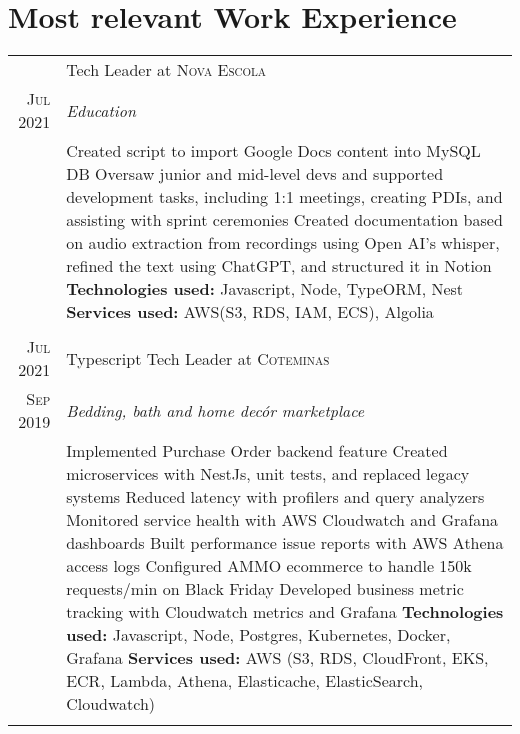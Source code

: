 \documentclass[a4paper,10pt]{article}
\begin{document}
\section{Most relevant Work Experience}
\begin{tabular}{r|p{11cm}}

\textsc & Tech Leader at \textsc{Nova Escola} \\\textsc{Jul 2021}&\emph{Education }\\&\footnotesize{ 
 Created script to import Google Docs content into MySQL DB \newline
 Oversaw junior and mid-level devs and supported development tasks, including 1:1 meetings, creating PDIs, and assisting with sprint ceremonies \newline
 Created documentation based on audio extraction from recordings using Open AI's whisper, refined the text using ChatGPT, and structured it in Notion\newline
 \textbf{Technologies used:} Javascript, Node, TypeORM, Nest \newline
\textbf{Services used:} AWS(S3, RDS, IAM, ECS), Algolia}\\\multicolumn{2}{c}{} \\


\textsc{Jul 2021} & Typescript Tech Leader at \textsc{Coteminas} \\\textsc{Sep 2019}&\emph{Bedding, bath and home decór marketplace }\\&\footnotesize{ 
 Implemented Purchase Order backend feature \newline
 Created microservices with NestJs, unit tests, and replaced legacy systems \newline
 Reduced latency with profilers and query analyzers \newline
 Monitored service health with AWS Cloudwatch and Grafana dashboards \newline
 Built performance issue reports with AWS Athena access logs \newline
 Configured AMMO ecommerce to handle 150k requests/min on Black Friday \newline
 Developed business metric tracking with Cloudwatch metrics and Grafana \newline 
\textbf{Technologies used:} Javascript, Node, Postgres, Kubernetes, Docker, Grafana \newline
\textbf{Services used:} AWS (S3, RDS, CloudFront, EKS, ECR, Lambda, Athena, Elasticache, ElasticSearch, Cloudwatch)}\\\multicolumn{2}{c}{} \\



\end{tabular}
\end{document}
